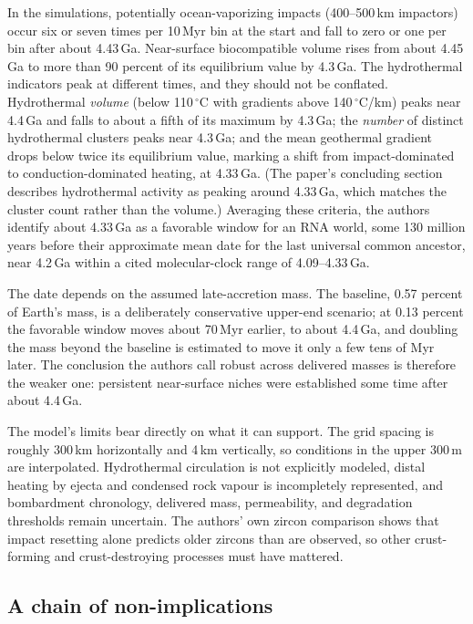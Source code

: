 \documentclass[11pt]{article}
\theoremstyle{definition}
\begin{document}
In the simulations, potentially ocean-vaporizing impacts (400--500\,km impactors) occur six or seven times per 10\,Myr bin at the start and fall to zero or one per bin after about 4.43\,Ga. Near-surface biocompatible volume rises from about 4.45\,Ga to more than 90 percent of its equilibrium value by 4.3\,Ga. The hydrothermal indicators peak at different times, and they should not be conflated. Hydrothermal \emph{volume} (below 110\,$^\circ$C with gradients above 140\,$^\circ$C/km) peaks near 4.4\,Ga and falls to about a fifth of its maximum by 4.3\,Ga; the \emph{number} of distinct hydrothermal clusters peaks near 4.3\,Ga; and the mean geothermal gradient drops below twice its equilibrium value, marking a shift from impact-dominated to conduction-dominated heating, at 4.33\,Ga. (The paper's concluding section describes hydrothermal activity as peaking around 4.33\,Ga, which matches the cluster count rather than the volume.) Averaging these criteria, the authors identify about 4.33\,Ga as a favorable window for an RNA world, some 130 million years before their approximate mean date for the last universal common ancestor, near 4.2\,Ga within a cited molecular-clock range of 4.09--4.33\,Ga.

The date depends on the assumed late-accretion mass. The baseline, 0.57 percent of Earth's mass, is a deliberately conservative upper-end scenario; at 0.13 percent the favorable window moves about 70\,Myr earlier, to about 4.4\,Ga, and doubling the mass beyond the baseline is estimated to move it only a few tens of Myr later. The conclusion the authors call robust across delivered masses is therefore the weaker one: persistent near-surface niches were established some time after about 4.4\,Ga.

The model's limits bear directly on what it can support. The grid spacing is roughly 300\,km horizontally and 4\,km vertically, so conditions in the upper 300\,m are interpolated. Hydrothermal circulation is not explicitly modeled, distal heating by ejecta and condensed rock vapour is incompletely represented, and bombardment chronology, delivered mass, permeability, and degradation thresholds remain uncertain. The authors' own zircon comparison shows that impact resetting alone predicts older zircons than are observed, so other crust-forming and crust-destroying processes must have mattered.

\subsection{A chain of non-implications}
\end{document}

